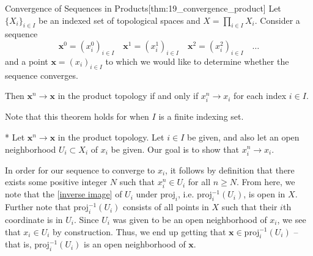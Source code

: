 \begin{thmBox}{Convergence of Sequences in Products}[thm:19_convergence_product]
    Let \( \{ X_{ i } \}_{ i \in I } \) be an indexed set of topological spaces
    and \( X = \prod_{ i \in I } X_{ i } \).
    Consider a sequence 
    \begin{equation*}
        \mathbf{x}^{ 0 } = ( x_{ i }^{ 0 } )_{ i \in I }
        \quad 
        \mathbf{x}^{ 1 } = ( x_{ i }^{ 1 } )_{ i \in I }
        \quad 
        \mathbf{x}^{ 2 } = ( x_{ i }^{ 2 } )_{ i \in I }
        \quad 
        \ldots
    \end{equation*}
    and a point \( \mathbf{x} = ( x_{ i } )_{ i \in I } \) to which we would
    like to determine whether the sequence converges.
    
    \baseSkip 

    Then \( \mathbf{x}^{ n } \rightarrow \mathbf{x} \) in the product topology
    if and only if \( x_{ i }^{ n } \rightarrow x_{ i } \) for each index 
    \( i \in I \).

    \baseSkip

    Note that this theorem holds for when \( I \) is a finite indexing set.

    \baseRule

    \begin{proofBox}*
        \wrapBox{\( \implies \)}
        Let \( \mathbf{x}^{ n } \rightarrow \mathbf{x} \) in the product 
        topology.
        Let \( i \in I \) be given, and also let an open neighborhood 
        \( U_{ i } \subset X_{ i } \) of \( x_{ i } \) be given.
        Our goal is to show that \( x_{ i }^{ n } \rightarrow x_{ i } \).

        \baseSkip 

        In order for our sequence to converge to \( x_{ i } \), it follows by 
        definition that 
        there exists some positive integer \( N \) such that \( x_{ i }^{ n } 
        \in U_{ i } \) for all \( n \geq N \).
        From here, we note that the [\hyperlink{thm:15_inv_img}{inverse image}] 
        of \( U_{ i } \) under \( \mathrm{proj}_{ i } \), i.e.
        \( \mathrm{proj}_{ i }^{ -1 } ( U_{ i } ) \), is open in \( X \).
        Further note that \( \mathrm{proj}_{ i }^{ -1 } ( U_{ i } ) \) 
        consists of all points in \( X \) such that their \( i \)th coordinate
        is in \( U_{ i } \). 
        Since \( U_{ i } \) was given to be an open neighborhood of 
        \( x_{ i } \), we see that \( x_{ i } \in U_{ i } \) by construction.
        Thus, we end up getting that \( \mathbf{x} \in 
        \mathrm{proj}_{ i }^{ -1 } ( U_{ i } ) \) -- that is, 
        \( \mathrm{proj}_{ i }^{ -1 } ( U_{ i } ) \) is an open neighborhood 
        of \( \mathbf{x} \).


\end{proofBox}
\end{thmBox}
